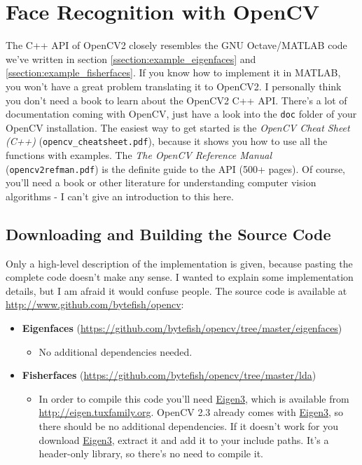 \section{Face Recognition with OpenCV}
The C++ API of OpenCV2 closely resembles the GNU Octave/MATLAB code we've written in section \ref{ssection:example_eigenfaces} and \ref{ssection:example_fisherfaces}. If you know how to implement it in MATLAB, you won't have a great problem translating it to OpenCV2. I personally think you don't need a book to learn about the OpenCV2 C++ API. There's a lot of documentation coming with OpenCV, just have a look into the \lstinline|doc| folder of your OpenCV installation. The easiest way to get started is the \textit{OpenCV Cheat Sheet (C++)} (\lstinline|opencv_cheatsheet.pdf|), because it shows you how to use all the functions with examples. The \textit{The OpenCV Reference Manual} (\lstinline|opencv2refman.pdf|) is the definite guide to the API (500+ pages). Of course, you'll need a book or other literature for understanding computer vision algorithms - I can't give an introduction to this here.

\subsection{Downloading and Building the Source Code}

Only a high-level description of the implementation is given, because pasting the complete code doesn't make any sense. I wanted to explain some implementation details, but I am afraid it would confuse people. The source code is available at \href{http://www.github.com/bytefish/opencv}{http://www.github.com/bytefish/opencv}:

\begin{itemize}
	\item \textbf{Eigenfaces} (\url{https://github.com/bytefish/opencv/tree/master/eigenfaces})
	\begin{itemize}
		\item No additional dependencies needed.
	\end{itemize}
	\item \textbf{Fisherfaces} (\url{https://github.com/bytefish/opencv/tree/master/lda})
	\begin{itemize}
		 \item In order to compile this code you'll need \href{http://eigen.tuxfamily.org/}{Eigen3}, which is available from \url{http://eigen.tuxfamily.org}. OpenCV 2.3 already comes with \href{http://eigen.tuxfamily.org/}{Eigen3}, so there should be no additional dependencies. If it doesn't work for you download \href{http://eigen.tuxfamily.org/}{Eigen3}, extract it and add it to your include paths. It's a header-only library, so there's no need to compile it.
	\end{itemize}
\end{itemize}

